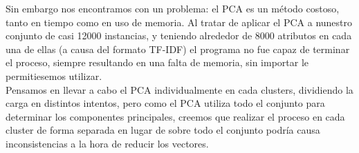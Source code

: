 \documentclass[10pt,a4paper]{article}
\begin{document}
Sin embargo nos encontramos con un problema: el PCA es un método costoso, tanto en tiempo como en uso de memoria. Al tratar de aplicar el PCA a nunestro conjunto de casi 12000 instancias, y teniendo alrededor de 8000 atributos en cada una de ellas (a causa del formato TF-IDF) el programa no fue capaz de terminar el proceso, siempre resultando en una falta de memoria, sin importar le permitiesemos utilizar.\\

Pensamos en llevar a cabo el PCA individualmente en cada clusters, dividiendo la carga en distintos intentos, pero como el PCA utiliza todo el conjunto para determinar los componentes principales, creemos que realizar el proceso en cada cluster de forma separada en lugar de sobre todo el conjunto podría causa inconsistencias a la hora de reducir los vectores.

\end{document}
